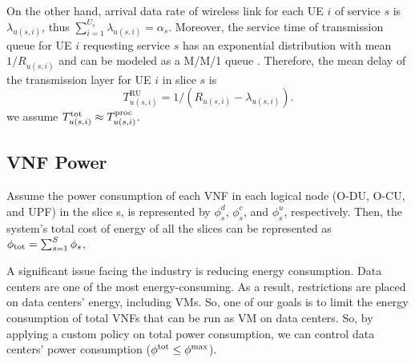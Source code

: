 \documentclass[lettersize,journal]{IEEEtran}
\begin{document}
On the other hand, arrival data rate of wireless link for each UE $i$ of service $s$ is $\lambda_{u(s,i)}$, thus $\sum_{i = 1}^{U_s} \lambda_{u(s,i)} = \alpha_s$.
Moreover, the service time of transmission queue for UE $i$ requesting service $s$ has
an exponential distribution with mean $1/R_{u(s,i)}$ and can be modeled as a M/M/1 queue \cite{SystemCostMinimization,luong2018joint,luong2018novel}.
Therefore, the mean delay of the transmission layer for UE $i$ in slice $s$ is
\begin{equation}
 T_{u(s,i)}^{\text{RU}} = 1/(R_{u(s,i)} - \lambda_{u(s,i)}).
\end{equation}
we assume $T^{\text{\text{tot}}}_{u(s,i)} \approx T^{\text{proc}}_{u(s,i)} $. %
\vspace{-3mm}
\subsection{VNF Power}
\vspace{-1mm}
Assume the power consumption of each VNF in each logical node (O-DU, O-CU, and UPF) in the slice s, is represented by $\phi_{s}^d$, $\phi_{s}^c$, and $\phi_{s}^u$, respectively.
Then, the system's total cost of energy of all the slices can be represented as $\textstyle \phi_{\text{\text{tot}}} = \sum_{s=1}^{S}\phi_{s}$,

A significant issue facing the industry is reducing energy consumption. Data centers are one of the most energy-consuming. As a result, restrictions are placed on data centers' energy, including VMs. So, one of our goals is to limit the energy consumption of total VNFs that can be run as VM on data centers. So, by applying a custom policy on total power consumption, we can control data centers' power consumption ($\phi^{\text{\text{tot}}}  \leq \phi^{\text{max}}$).
\vspace{-3mm}
\end{document}
